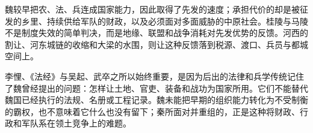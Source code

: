 \begin{turningpoint}
魏较早把农、法、兵连成国家能力，因此取得了先发的速度；承担代价的却是被征发的乡里、持续供给军队的财政，以及必须面对多面威胁的中原社会。桂陵与马陵不是制度失效的简单判决，而是地缘、联盟和战争消耗对先发优势的反馈。河西的割让、河东城链的收缩和大梁的水围，则让这种反馈落到税源、渡口、兵员与都城空间上。

李悝、《法经》与吴起、武卒之所以始终重要，是因为后出的法律和兵学传统记住了魏曾经提出的问题：怎样让土地、官吏、装备和战功为国家所用。它们不能替代魏国已经执行的法规、名册或工程记录。魏未能把早期的组织能力转化为不受制衡的霸权，也不意味着它什么也没有留下；秦所面对并重组的，正是这种将财政、行政和军队系在领土竞争上的难题。
\end{turningpoint}
\endgroup
